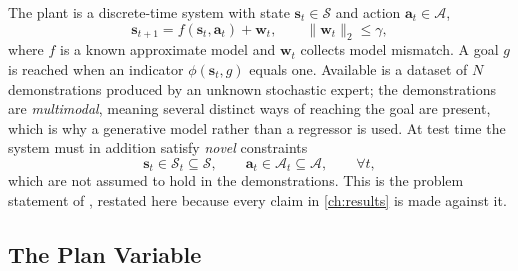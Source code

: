 \documentclass[headsepline,footsepline,footinclude=false,oneside,fontsize=11pt,paper=a4,listof=totoc,bibliography=totoc]{scrbook}
\theoremstyle{definition}
\theoremstyle{plain}
\theoremstyle{remark}
\newcommand{\vect}[1]{\boldsymbol{#1}}
\begin{document}
The plant is a discrete-time system with state $\vect{s}_{t}\in\mathcal{S}$ and action
$\vect{a}_{t}\in\mathcal{A}$,
\begin{equation}\label{eq:method:plant}
  \vect{s}_{t+1} = f(\vect{s}_{t},\vect{a}_{t}) + \vect{w}_{t},
  \qquad \|\vect{w}_{t}\|_{2}\le\gamma,
\end{equation}
where $f$ is a known approximate model and $\vect{w}_{t}$ collects model mismatch. A goal
$g$ is reached when an indicator $\phi(\vect{s}_{t},g)$ equals one. Available is a dataset of
$N$ demonstrations produced by an unknown stochastic expert; the demonstrations are
\emph{multimodal}, meaning several distinct ways of reaching the goal are present, which is
why a generative model rather than a regressor is used. At test time the system must in
addition satisfy \emph{novel} constraints
\begin{equation}\label{eq:method:constraints}
  \vect{s}_{t}\in\mathcal{S}_{t}\subseteq\mathcal{S},
  \qquad \vect{a}_{t}\in\mathcal{A}_{t}\subseteq\mathcal{A},
  \qquad \forall t,
\end{equation}
which are not assumed to hold in the demonstrations. This is the problem statement of
\parencite[Sec.~3]{romer2025diffusion}, restated here because every claim in \autoref{ch:results} is made
against it.

\subsection{The Plan Variable}
\end{document}
